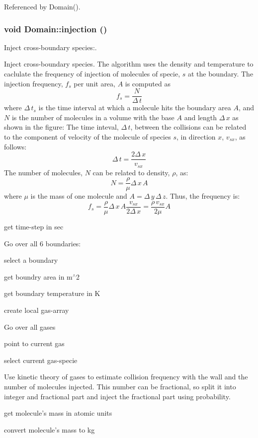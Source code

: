 Referenced by Domain().\hypertarget{classDomain_0ab601495bdb6dcb0b8001e6c23624d1}{
\subsubsection[{injection}]{\setlength{\rightskip}{0pt plus 5cm}void Domain::injection ()}}
\label{classDomain_0ab601495bdb6dcb0b8001e6c23624d1}


Inject cross-boundary species:. 

Inject cross-boundary species. The algorithm uses the density and temperature to caclulate the frequency of injection of molecules of specie, $s$ at the boundary. The injection frequency, $f_s$ per unit area, $A$ is computed as \[ f_s = \frac{N}{\Delta\,t} \] where $\Delta\,t_s$ is the time interval at which a molecule hits the boundary area $A$, and $N$ is the number of molecules in a volume with the base $A$ and length $\Delta\,x$ as shown in the figure:  The time inteval, $\Delta\,t$, between the collisions can be related to the component of velocity of the molecule of species $s$, in direction $x$, $v_{sx}$, as follows: \[ \Delta\,t = \frac{2\Delta\,x}{v_{sx}} \] The number of molecules, $N$ can be related to density, $\rho$, as: \[ N = \frac{\rho}{\mu}\Delta\,x\,A \] where $\mu$ is the mass of one molecule and $A = \Delta\,y\,\Delta\,z$. Thus, the frequency is: \[ f_s = \frac{\rho}{\mu}\Delta\,x\,A\frac{v_{sx}}{2\Delta\,x} = \frac{\rho\,v_{sx}}{2\mu}A \] 

get time-step in sec

Go over all 6 boundaries:

select a boundary

get boundry area in m$^\wedge$2

get boundary temperature in K

create local gas-array

Go over all gases

point to current gas

select current gas-specie

Use kinetic theory of gases to estimate collision frequency with the wall and the number of molecules injected. This number can be fractional, so split it into integer and fractional part and inject the fractional part using probability.

get molecule's mass in atomic units

convert molecule's mass to kg

